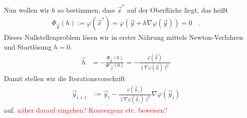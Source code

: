       Nun wollen wir \( h \) so bestimmen, dass \(\vec{x}^{*}\) auf der Oberfläche liegt, das heißt
      \begin{align}
        \Phi_{\vec{y}}(h) := \varphi(\vec{x}^{*}) = \varphi(\vec{y} +  h \nabla\varphi(\vec{y})) = 0 \quad\text{.}
      \end{align}
      Dieses Nullstellenproblem lösen wir in erster Nährung mittels Newton-Verfahren und Startlösung \( h=0 \).
      \begin{align}
        \hat{h} &= - \frac{\Phi_{\vec{y}}(0)}{\Phi'_{\vec{y}}(0)}
                = - \frac{\varphi(\vec{y})}{\|\nabla\varphi(\vec{y})\|^{2}}
      \end{align}
      Damit stellen wir die Iterationsvorschrift
      \begin{align}
        \vec{y}_{i+1} &:= \vec{y}_{i} - \frac{\varphi(\vec{y}_{i})}{\|\nabla\varphi(\vec{y}_{i})\|^{2}}  \nabla\varphi(\vec{y}_{i})
      \end{align}
      auf.
      \textcolor{red}{näher darauf eingehen? Konvergenz etc. beweisen?}
